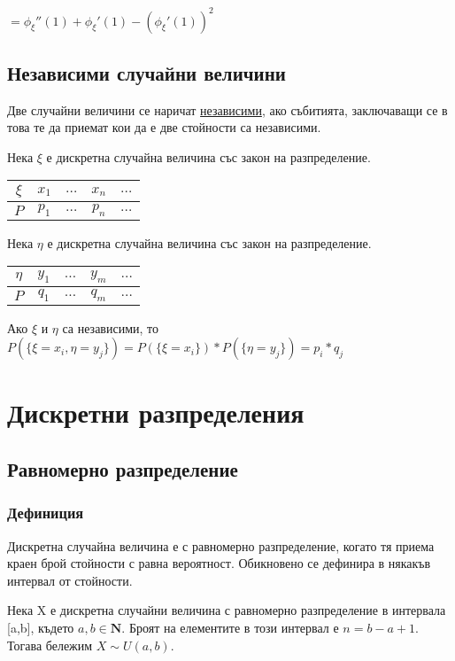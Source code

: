 \documentclass[fleqn,12pt]{article}
\begin{document}
\begin{justify}
$= \phi_\xi''(1) + \phi_\xi'(1) - (\phi_\xi'(1))^2$

\subsection{Независими случайни величини}
Две случайни величини се наричат \underline{независими}, ако събитията, заключаващи се в това те да приемат кои да е 
две стойности са независими.

Нека $\xi$ е дискретна случайна величина със закон на разпределение.\\
\begin{tabular}{|c|c|c|c|c|}
    \hline
    $\xi$ & $x_1$ & $\dots$ & $x_n$ & $\dots$ \\
    \hline
    $P$ & $p_1$ & $\dots$ & $p_n$ & $\dots$ \\
    \hline
\end{tabular}

Нека $\eta$ е дискретна случайна величина със закон на разпределение.\\
\begin{tabular}{|c|c|c|c|c|}
    \hline
    $\eta$ & $y_1$ & $\dots$ & $y_m$ & $\dots$ \\
    \hline
    $P$ & $q_1$ & $\dots$ & $q_m$ & $\dots$ \\
    \hline
\end{tabular}

Ако $\xi$ и $\eta$ са независими, то $P(\{\xi=x_i,\eta=y_j\}) = P(\{\xi=x_i\})*P(\{\eta=y_j\}) = p_i*q_j$

\section{Дискретни разпределения}
\subsection{Равномерно разпределение}
\subsubsection{Дефиниция} 
Дискретна случайна величина е с равномерно разпределение, когато тя приема краен брой стойности с равна вероятност.
Обикновено се дефинира в някакъв интервал от стойности. 

Нека X е дискретна случайни величина с равномерно разпределение в интервала [a,b], където $a,b \in \mathbf{N}$.
 Броят на елементите в този интервал
е $n = b - a + 1$. Тогава бележим $X \sim U(a, b)$.


\end{justify}
\end{document}

